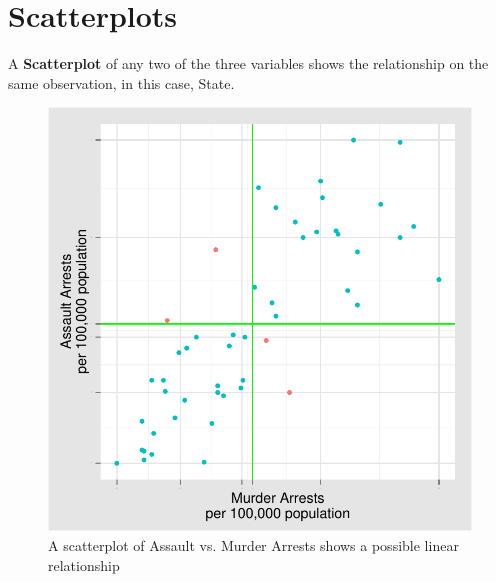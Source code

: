 \documentclass[nohyper,justified]{tufte-handout}\usepackage[]{graphicx}\usepackage[]{color}
\makeatletter
\def\maxwidth{ %
  \ifdim\Gin@nat@width>\linewidth
    \linewidth
  \else
    \Gin@nat@width
  \fi
}
\newenvironment{knitrout}{}{} %
\makeatother
\begin{document}
\newpage
\section{Scatterplots}
A \textbf{Scatterplot} of any two of the three variables shows the relationship on the same observation, in this case, State. 
\begin{knitrout}
\color{fgcolor}\begin{figure}

{\centering \includegraphics[width=\maxwidth]{figure/graphics-scatterplotsxy-1} 

}

\caption[A scatterplot of Assault vs]{A scatterplot of Assault vs. Murder Arrests shows a possible linear relationship}\label{fig:scatterplotsxy}
\end{figure}


\end{knitrout}
\end{document}

